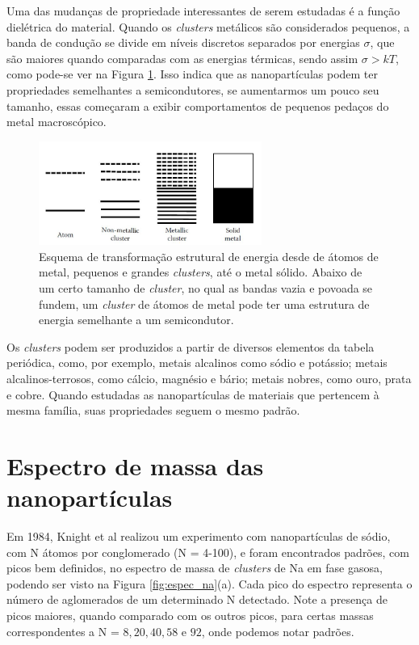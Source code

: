 Uma das mudanças de propriedade interessantes de serem estudadas é a função dielétrica do material. Quando os \textit{clusters} metálicos são considerados pequenos, a banda de condução se divide em níveis discretos separados por energias $\sigma$, que são maiores quando comparadas com as energias térmicas, sendo assim $\sigma>kT$, como pode-se ver na Figura \ref{fig:carac_metal}. Isso indica que as nanopartículas podem ter propriedades semelhantes a semicondutores, se aumentarmos um pouco seu tamanho, essas começaram a exibir comportamentos de pequenos pedaços do metal macroscópico.

\begin{figure}
  \centering
  \includegraphics[width=0.65\textwidth]{images/clusters/carac_metal}
  \caption{ Esquema de transformação estrutural de energia desde de átomos de metal, pequenos e grandes \textit{clusters}, até o metal sólido. Abaixo de um certo tamanho de \textit{cluster}, no qual as bandas vazia e povoada se fundem, um \textit{cluster} de átomos de metal pode ter uma estrutura de energia semelhante a um semicondutor.\cite{dissertacao_anderson}  }
  \label{fig:carac_metal}
\end{figure}

Os \textit{clusters} podem ser produzidos a partir de diversos elementos da tabela periódica, como, por exemplo, metais alcalinos como sódio e potássio; metais alcalinos-terrosos, como cálcio, magnésio e bário; metais nobres, como ouro, prata  e cobre. Quando estudadas as nanopartículas de materiais que pertencem à mesma família, suas propriedades seguem o mesmo padrão.


\section{Espectro de massa das nanopartículas}

Em 1984, Knight et al \cite{electronic_Shell_sodium} realizou um experimento com nanopartículas de sódio, com N átomos por conglomerado (N = 4-100), e foram encontrados padrões, com picos bem definidos, no espectro de massa de \textit{clusters} de Na em fase gasosa, podendo ser visto na Figura \ref{fig:espec_na}(a). Cada pico do espectro representa o número de 
aglomerados de um determinado N detectado. Note a presença de picos maiores, quando comparado com os outros picos, para certas massas correspondentes a N = $8, 20, 40, 58$ e $92$, onde podemos notar padrões. 




